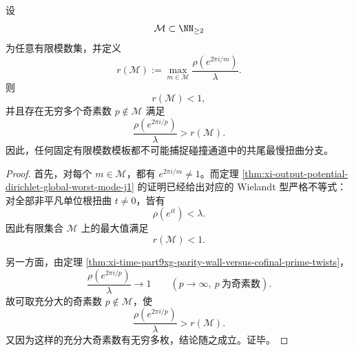 \begin{corollary}[有限模数模板不能捕捉最慢扭曲分支]\label{cor:xi-time-part9xg-finite-modulus-template-misses-slowest-twist}
设
\[
\mathcal M\subset \NN_{\ge 2}
\]
为任意有限模数集，并定义
\[
r(\mathcal M):=\max_{m\in\mathcal M}\frac{\rho(e^{2\pi i/m})}{\lambda}.
\]
则
\[
r(\mathcal M)<1,
\]
并且存在无穷多个奇素数 \(p\notin\mathcal M\) 满足
\[
\frac{\rho(e^{2\pi i/p})}{\lambda}>r(\mathcal M).
\]
因此，任何固定有限模数模板都不可能捕捉碰撞通道中的共尾最慢扭曲分支。
\end{corollary}
\begin{proof}
首先，对每个 \(m\in\mathcal M\)，都有 \(e^{2\pi i/m}\neq 1\)。而定理 \ref{thm:xi-output-potential-dirichlet-global-worst-mode-j1} 的证明已经给出对应的 Wielandt 型严格不等式：对全部非平凡单位根扭曲 \(t\neq 0\)，皆有
\[
\rho(e^{it})<\lambda.
\]
因此有限集合 \(\mathcal M\) 上的最大值满足
\[
r(\mathcal M)<1.
\]

另一方面，由定理 \ref{thm:xi-time-part9xg-parity-wall-versus-cofinal-prime-twists}，
\[
\frac{\rho(e^{2\pi i/p})}{\lambda}\to 1
\qquad
(p\to\infty,\ p\ \text{为奇素数}).
\]
故可取充分大的奇素数 \(p\notin\mathcal M\)，使
\[
\frac{\rho(e^{2\pi i/p})}{\lambda}>r(\mathcal M).
\]
又因为这样的充分大奇素数有无穷多枚，结论随之成立。证毕。
\end{proof}

